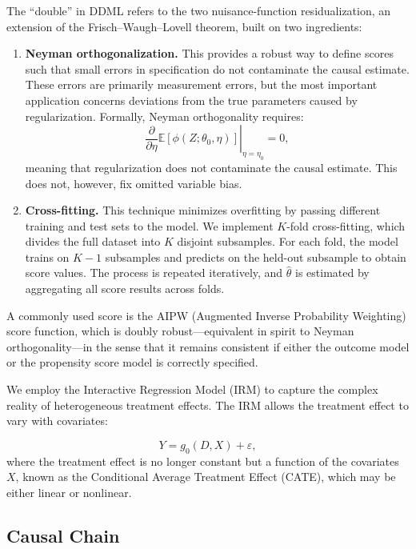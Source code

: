 \documentclass [11pt]{article}
\theoremstyle{plain}
\theoremstyle{definition}
\theoremstyle{remark}
\newcommand{\1}{\bm{1}}
\newcommand{\E}{\mathbb{E}}
\begin{document}
The ``double'' in DDML refers to the two nuisance-function residualization, an extension of the Frisch--Waugh--Lovell theorem, built on two ingredients:

\begin{enumerate}
\item \textbf{Neyman orthogonalization.} This provides a robust way to define scores such that small errors in specification do not contaminate the causal estimate. These errors are primarily measurement errors, but the most important application concerns deviations from the true parameters caused by regularization. Formally, Neyman orthogonality requires:
\begin{equation}
\left. \frac{\partial}{\partial \eta} \E[\phi(Z; \theta_0, \eta)] \right|_{\eta = \eta_0} = 0,
\end{equation}
meaning that regularization does not contaminate the causal estimate. This does not, however, fix omitted variable bias.

\item \textbf{Cross-fitting.} This technique minimizes overfitting by passing different training and test sets to the model. We implement $K$-fold cross-fitting, which divides the full dataset into $K$ disjoint subsamples. For each fold, the model trains on $K-1$ subsamples and predicts on the held-out subsample to obtain score values. The process is repeated iteratively, and $\hat{\theta}$ is estimated by aggregating all score results across folds.
\end{enumerate}

A commonly used score is the AIPW (Augmented Inverse Probability Weighting) score function, which is doubly robust---equivalent in spirit to Neyman orthogonality---in the sense that it remains consistent if either the outcome model or the propensity score model is correctly specified.

We employ the Interactive Regression Model (IRM) to capture the complex reality of heterogeneous treatment effects. The IRM allows the treatment effect to vary with covariates:

\begin{equation}
Y = g_0(D, X) + \varepsilon,
\end{equation}
where the treatment effect is no longer constant but a function of the covariates $X$, known as the Conditional Average Treatment Effect (CATE), which may be either linear or nonlinear.


\subsection{Causal Chain}
\end{document}
